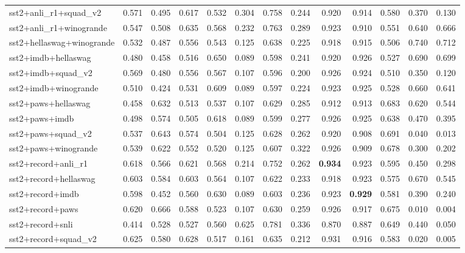\begin{table}[t]
\begin{tabular}{lrrrrrrrrrrrr}
    sst2+anli\_r1+squad\_v2 & 0.571 & 0.495 & 0.617 & 0.532 & 0.304 & 0.758 & 0.244 & 0.920 & 0.914 & 0.580 & 0.370 & 0.130 \\
    sst2+anli\_r1+winogrande & 0.547 & 0.508 & 0.635 & 0.568 & 0.232 & 0.763 & 0.289 & 0.923 & 0.910 & 0.551 & 0.640 & 0.666 \\
    sst2+hellaswag+winogrande & 0.532 & 0.487 & 0.556 & 0.543 & 0.125 & 0.638 & 0.225 & 0.918 & 0.915 & 0.506 & 0.740 & 0.712 \\
    sst2+imdb+hellaswag & 0.480 & 0.458 & 0.516 & 0.650 & 0.089 & 0.598 & 0.241 & 0.920 & 0.926 & 0.527 & 0.690 & 0.699 \\
    sst2+imdb+squad\_v2 & 0.569 & 0.480 & 0.556 & 0.567 & 0.107 & 0.596 & 0.200 & 0.926 & 0.924 & 0.510 & 0.350 & 0.120 \\
    sst2+imdb+winogrande & 0.510 & 0.424 & 0.531 & 0.609 & 0.089 & 0.597 & 0.224 & 0.923 & 0.925 & 0.528 & 0.660 & 0.641 \\
    sst2+paws+hellaswag & 0.458 & 0.632 & 0.513 & 0.537 & 0.107 & 0.629 & 0.285 & 0.912 & 0.913 & 0.683 & 0.620 & 0.544 \\
    sst2+paws+imdb & 0.498 & 0.574 & 0.505 & 0.618 & 0.089 & 0.599 & 0.277 & 0.926 & 0.925 & 0.638 & 0.470 & 0.395 \\
    sst2+paws+squad\_v2 & 0.537 & 0.643 & 0.574 & 0.504 & 0.125 & 0.628 & 0.262 & 0.920 & 0.908 & 0.691 & 0.040 & 0.013 \\
    sst2+paws+winogrande & 0.539 & 0.622 & 0.552 & 0.520 & 0.125 & 0.607 & 0.322 & 0.926 & 0.909 & 0.678 & 0.300 & 0.202 \\
    sst2+record+anli\_r1 & 0.618 & 0.566 & 0.621 & 0.568 & 0.214 & 0.752 & 0.262 & \textbf{0.934} & 0.923 & 0.595 & 0.450 & 0.298 \\
    sst2+record+hellaswag & 0.603 & 0.584 & 0.603 & 0.564 & 0.107 & 0.622 & 0.233 & 0.918 & 0.923 & 0.575 & 0.670 & 0.545 \\
    sst2+record+imdb & 0.598 & 0.452 & 0.560 & 0.630 & 0.089 & 0.603 & 0.236 & 0.923 & \textbf{0.929} & 0.581 & 0.390 & 0.240 \\
    sst2+record+paws & 0.620 & 0.666 & 0.588 & 0.523 & 0.107 & 0.630 & 0.259 & 0.926 & 0.917 & 0.675 & 0.010 & 0.004 \\
    sst2+record+snli & 0.414 & 0.528 & 0.527 & 0.560 & 0.625 & 0.781 & 0.336 & 0.870 & 0.887 & 0.649 & 0.440 & 0.050 \\
    sst2+record+squad\_v2 & 0.625 & 0.580 & 0.628 & 0.517 & 0.161 & 0.635 & 0.212 & 0.931 & 0.916 & 0.583 & 0.020 & 0.005 \\

\end{tabular}
\end{table}
